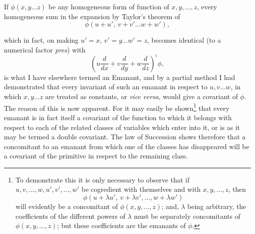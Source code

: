 \documentclass[11pt]{article}
\newcommand{\sourcepage}[1]{\marginpar{\scriptsize p.~#1}}
\begin{document}
{{If $\phi(x,y\ldots z)$ be any homogeneous form of function of $x,y,\ldots,z$, every homogeneous sum in the expansion by Taylor's theorem of
\[
\phi(u+u',\ v+v'\ldots w+w'),
\]

\sourcepage{288}
which in fact, on making $u'=x$, $v'=y\ldots w'=z$, becomes identical (to a numerical factor \emph{pres}) with
\[
\left(u\frac{d}{dx}+v\frac{d}{dy}+w\frac{d}{dz}\right)^\iota\phi,
\]
is what I have elsewhere termed an Emanant, and by a partial method I had demonstrated that every invariant of such an emanant in respect to $u,v\ldots w$, in which $x,y\ldots z$ are treated as constants, or \emph{vice versa}, would give a covariant of $\phi$. The reason of this is now apparent. For it may easily be shown\footnote{To demonstrate this it is only necessary to observe that if $u,v,\ldots,w,u',v',\ldots,w'$ be cogredient with themselves and with $x,y,\ldots,z$, then
\[
\phi(u+\lambda u',\ v+\lambda v',\ldots,w+\lambda w')
\]
will evidently be a concomitant of $\phi(x,y,\ldots,z)$; and, $\lambda$ being arbitrary, the coefficients of the different powers of $\lambda$ must be separately concomitants of $\phi(x,y,\ldots,z)$; but these coefficients are the emanants of $\phi$.} that every emanant is in fact itself a covariant of the function to which it belongs with respect to each of the related classes of variables which enter into it, or is as it may be termed a double covariant. The law of Succession shows therefore that a concomitant to an emanant from which one of the classes has disappeared will be a covariant of the primitive in respect to the remaining class.

}}
\end{document}
